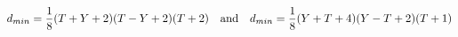 \begin{equation}
d_{min}={1\over 8}(T+Y+2)(T-Y+2)(T+2) \quad\hbox{and}\quad
d_{min}={1\over 8}(Y+T+4)(Y-T+2)(T+1)
\end{equation}

